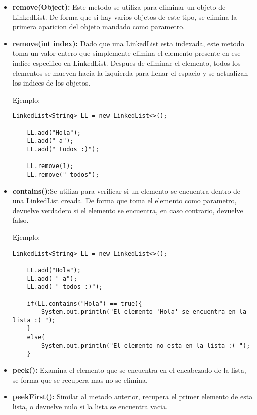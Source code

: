 \documentclass[12pt, letterpaper]{article} %
\begin{document}
\begin{itemize}
    \item \textbf{remove(Object):} Este metodo se utiliza para eliminar un objeto de LinkedList. De forma que si hay varios objetos de este tipo, se elimina la primera aparicion del objeto mandado como parametro.
    
    \item \textbf{remove(int index):} Dado que una LinkedList esta indexada, este metodo toma un valor entero que simplemente elimina el elemento presente en ese indice especifico en LinkedList. Despues de eliminar el elemento, todos los elementos se mueven hacia la izquierda para llenar el espacio y se actualizan los indices de los objetos.

    Ejemplo:
    \lstset{language = Java, breaklines=true, basicstyle=\footnotesize}
    \begin{lstlisting}[frame=single]
    LinkedList<String> LL = new LinkedList<>();

    LL.add("Hola");  
    LL.add(" a");
    LL.add(" todos :)");

    LL.remove(1);
    LL.remove(" todos");
    \end{lstlisting}
    
    \item \textbf{contains():}Se utiliza para verificar si un elemento se encuentra dentro de una LinkedList creada. De forma que toma el elemento como parametro, devuelve verdadero si el elemento se encuentra, en caso contrario, devuelve falso.

    Ejemplo:
    \lstset{language = Java, breaklines=true, basicstyle=\footnotesize}
    \begin{lstlisting}[frame=single]
    LinkedList<String> LL = new LinkedList<>();

    LL.add("Hola");  
    LL.add( " a");
    LL.add( " todos :)");

    if(LL.contains("Hola") == true){
        System.out.println("El elemento 'Hola' se encuentra en la lista :) ");
    }
    else{
    	System.out.println("El elemento no esta en la lista :( ");
    }
    \end{lstlisting}
    
    \item \textbf{peek():} Examina el elemento que se encuentra en el encabezado de la lista, se forma que se recupera mas no se elimina.
    
    \item \textbf{peekFirst():} Similar al metodo anterior, recupera el primer elemento de esta lista, o devuelve nulo si la lista se encuentra vacia.
    

\end{itemize}
\end{document}
